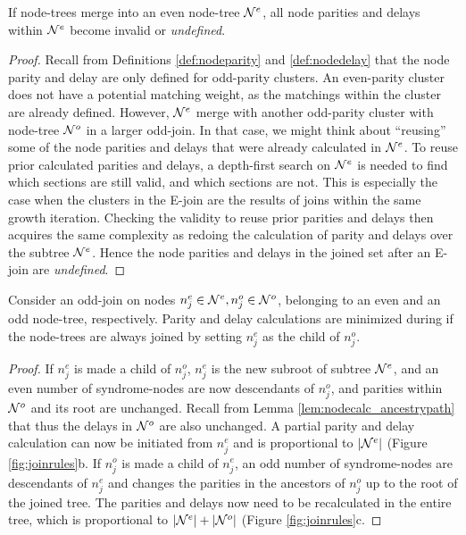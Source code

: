\begin{lemma}\label{lem:nodecalc_even}
  If node-trees merge into an even node-tree $\mathcal{N}^e$, all node parities and delays within $\mathcal{N}^e$ become invalid or \emph{undefined}. 
\end{lemma}
\begin{proof}
  Recall from Definitions \ref{def:nodeparity} and \ref{def:nodedelay} that the node parity and delay are only defined for odd-parity clusters. An even-parity cluster does not have a potential matching weight, as the matchings within the cluster are already defined. However, $\mathcal{N}^e$ merge with another odd-parity cluster with node-tree $\mathcal{N}^o$ in a larger odd-join. In that case, we might think about ``reusing'' some of the node parities and delays that were already calculated in $\mathcal{N}^e$. To reuse prior calculated parities and delays, a depth-first search on $\mathcal{N}^e$ is needed to find which sections are still valid, and which sections are not. This is especially the case when the clusters in the E-join are the results of joins within the same growth iteration. Checking the validity to reuse prior parities and delays then acquires the same complexity as redoing the calculation of parity and delays over the subtree $\mathcal{N}^e$. Hence the node parities and delays in the joined set after an E-join are \emph{undefined}.
\end{proof}

\begin{lemma}\label{lem:nodecalc_odd}
  Consider an odd-join on nodes $n_j^e \in \mathcal{N}^e, n_j^o\in \mathcal{N}^o$, belonging to an even and an odd node-tree, respectively. Parity and delay calculations are minimized during if the node-trees are always joined by setting $n_j^e$ as the child of $n_j^o$. 
\end{lemma}
\begin{proof}
  If $n_j^e$ is made a child of $n_j^o$, $n_j^e$ is the new subroot of subtree $\mathcal{N}^e$, and an even number of syndrome-nodes are now descendants of $n_j^o$, and parities within $\mathcal{N}^o$ and its root are unchanged. Recall from Lemma \ref{lem:nodecalc_ancestrypath} that thus the delays in $\mathcal{N}^o$ are also unchanged. A partial parity and delay calculation can now be initiated from $n_j^e$ and is proportional to $|\mathcal{N}^e|$ (Figure \ref{fig:joinrules}b. If $n_j^o$ is made a child of $n_j^e$, an odd number of syndrome-nodes are descendants of $n_j^e$ and changes the parities in the ancestors of $n_j^o$ up to the root of the joined tree. The parities and delays now need to be recalculated in the entire tree, which is proportional to $|\mathcal{N}^e| + |\mathcal{N}^o|$ (Figure \ref{fig:joinrules}c. 
\end{proof}

